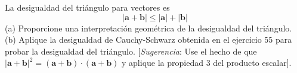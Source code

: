 \item La desigualdad del triángulo para vectores es 
    \[
    |\mathbf{a} + \mathbf{b}| \leqslant |\mathbf{a}| + |\mathbf{b}|
    \]
    (a) Proporcione una interpretación geométrica de la desigualdad del triángulo. \\
    (b) Aplique la desigualdad de Cauchy-Schwarz obtenida en el ejercicio 55 para probar la desigualdad del triángulo. [\textit{Sugerencia}: Use el hecho de que $|\mathbf{a} + \mathbf{b}|^2 = (\mathbf{a} + \mathbf{b}) \cdot (\mathbf{a} + \mathbf{b})$ y aplique la propiedad 3 del producto escalar].
